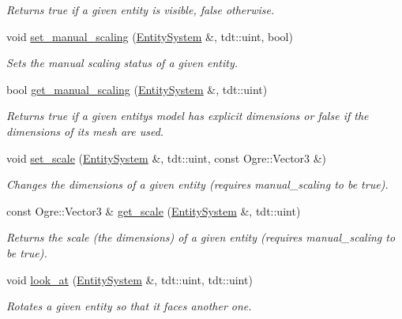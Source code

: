 \begin{DoxyCompactItemize}
\begin{DoxyCompactList}\small\item\em Returns true if a given entity is visible, false otherwise. \end{DoxyCompactList}\item 
void \hyperlink{namespace_graphics_helper_a9e620348ed63ae0a60457dbc7af8674f}{set\+\_\+manual\+\_\+scaling} (\hyperlink{class_entity_system}{Entity\+System} \&, tdt\+::uint, bool)
\begin{DoxyCompactList}\small\item\em Sets the manual scaling status of a given entity. \end{DoxyCompactList}\item 
bool \hyperlink{namespace_graphics_helper_a35bf19ae4b70552657ab3ee7ebde36a5}{get\+\_\+manual\+\_\+scaling} (\hyperlink{class_entity_system}{Entity\+System} \&, tdt\+::uint)
\begin{DoxyCompactList}\small\item\em Returns true if a given entity\textquotesingle{}s model has explicit dimensions or false if the dimensions of it\textquotesingle{}s mesh are used. \end{DoxyCompactList}\item 
void \hyperlink{namespace_graphics_helper_ab878b589740c8720d45372edd3becae0}{set\+\_\+scale} (\hyperlink{class_entity_system}{Entity\+System} \&, tdt\+::uint, const Ogre\+::\+Vector3 \&)
\begin{DoxyCompactList}\small\item\em Changes the dimensions of a given entity (requires manual\+\_\+scaling to be true). \end{DoxyCompactList}\item 
const Ogre\+::\+Vector3 \& \hyperlink{namespace_graphics_helper_a7666cd68453afc50a0c22c34b1de223c}{get\+\_\+scale} (\hyperlink{class_entity_system}{Entity\+System} \&, tdt\+::uint)
\begin{DoxyCompactList}\small\item\em Returns the scale (the dimensions) of a given entity (requires manual\+\_\+scaling to be true). \end{DoxyCompactList}\item 
void \hyperlink{namespace_graphics_helper_a9273a7e72716f701ff1dfb1fdab0e078}{look\+\_\+at} (\hyperlink{class_entity_system}{Entity\+System} \&, tdt\+::uint, tdt\+::uint)
\begin{DoxyCompactList}\small\item\em Rotates a given entity so that it faces another one. \end{DoxyCompactList}\item 

\end{DoxyCompactItemize}
